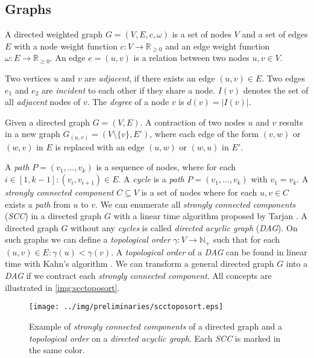 \subsection{Graphs}

\begin{definition}
A directed weighted graph $G = (V,E,c,\omega)$ is a set of nodes $V$ 
and a set of edges $E$ with a node weight function 
$c: V \rightarrow \mathbb{R}_{\ge 0}$ and an edge weight 
function $\omega: E \rightarrow \mathbb{R}_{\ge 0}$. An edge $e = (u,v)$ 
is a relation between two nodes $u,v \in V$.
\label{def:hypergraph}
\end{definition}

Two vertices $u$ and $v$ are \emph{adjacent}, if there exists an edge
$(u,v) \in E$. Two edges $e_1$ and $e_2$ are \emph{incident} to each other if they
share a node. $I(v)$ denotes the set of all \emph{adjacent} nodes of 
$v$. The \emph{degree} of a node $v$ is $d(v) = |I(v)|$.

\begin{definition}
Given a directed graph $G = (V,E)$. A contraction of two nodes
$u$ and $v$ results in a new graph $G_{(u,v)} = (V\setminus\{v\},E')$, where
each edge of the form $(v,w)$ or $(w,v)$ in $E$ is replaced with an edge 
$(u,w)$ or $(w,u)$ in $E'$.
\label{def:contraction}
\end{definition}

A \emph{path} $P = (v_1,\ldots,v_k)$ is a sequence of nodes, where for
each $i \in [1,k-1]: (v_i,v_{i+1}) \in E$. A \emph{cycle} is a \emph{path}
$P = (v_1,\ldots,v_k)$ with $v_1 = v_k$. A \emph{strongly connected 
component} $C \subseteq V$ is a set of nodes where for each $u,v \in C$
exists a \emph{path} from $u$ to $v$. We can enumerate all \emph{strongly
connected components} (\emph{SCC}) in a directed graph $G$ with a linear time algorithm
proposed by Tarjan \cite{tarjan1972depth}. A directed graph $G$ without
any \emph{cycles} is called \emph{directed acyclic graph} (\emph{DAG}). On such
graphs we can define a \emph{topological order} $\gamma: V \rightarrow \mathbb{N}_+$ such
that for each $(u,v) \in E: \gamma(u) < \gamma(v)$. A \emph{topological order}
of a \emph{DAG} can be found in linear time with Kahn's algorithm \cite{kahn1962topological}.
We can transform a general directed graph $G$ into a \emph{DAG} if we contract
each \emph{strongly connected component}. All concepts are illustrated in 
\autoref{img:scctoposort}.

\begin{figure}[ht!]
\centering
\texttt{[image: ../img/preliminaries/scctoposort.eps]}
\caption{Example of \emph{strongly connected components} of a directed graph and
         a \emph{topological order} on a \emph{directed acyclic graph}. Each 
         \emph{SCC} is marked in the same color.} 
\label{img:scctoposort}
\end{figure}

